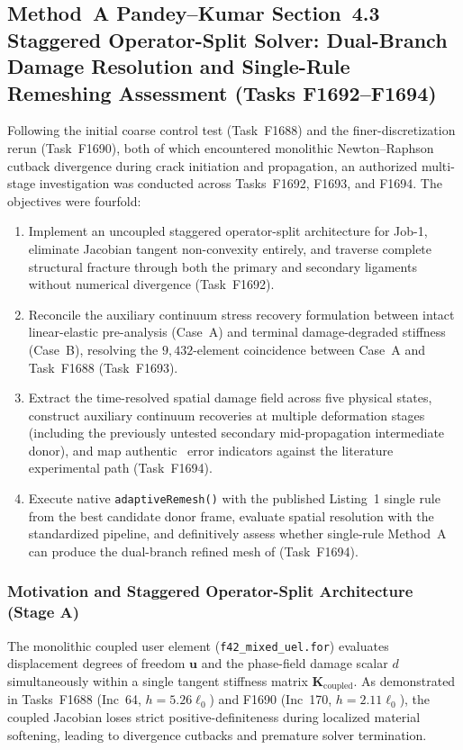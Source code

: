 \subsection{Method~A Pandey--Kumar Section~4.3 Staggered Operator-Split Solver: Dual-Branch Damage Resolution and Single-Rule Remeshing Assessment (Tasks F1692--F1694)}
\label{subsec:pandey_kumar_sec43_staggered}

Following the initial coarse control test (Task~F1688) and the finer-discretization rerun (Task~F1690), both of which encountered monolithic Newton--Raphson cutback divergence during crack initiation and propagation, an authorized multi-stage investigation was conducted across Tasks~F1692, F1693, and F1694. The objectives were fourfold:
\begin{enumerate}
  \item Implement an uncoupled staggered operator-split architecture for Job-1, eliminate Jacobian tangent non-convexity entirely, and traverse complete structural fracture through both the primary and secondary ligaments without numerical divergence (Task~F1692).
  \item Reconcile the auxiliary continuum stress recovery formulation between intact linear-elastic pre-analysis (Case~A) and terminal damage-degraded stiffness (Case~B), resolving the $9{,}432$-element coincidence between Case~A and Task~F1688 (Task~F1693).
  \item Extract the time-resolved spatial damage field across five physical states, construct auxiliary continuum recoveries at multiple deformation stages (including the previously untested secondary mid-propagation intermediate donor), and map authentic \MISESERI\ error indicators against the literature experimental path (Task~F1694).
  \item Execute native \Abaqus \texttt{adaptiveRemesh()} with the published Listing~1 single rule from the best candidate donor frame, evaluate spatial resolution with the standardized pipeline, and definitively assess whether single-rule Method~A can produce the dual-branch refined mesh of \citet[Fig.~16b]{pandey2025} (Task~F1694).
\end{enumerate}

\subsubsection{Motivation and Staggered Operator-Split Architecture (Stage A)}
The monolithic coupled user element (\texttt{f42\_mixed\_uel.for}) evaluates displacement degrees of freedom $\mathbf{u}$ and the phase-field damage scalar $d$ simultaneously within a single tangent stiffness matrix $\mathbf{K}_{\mathrm{coupled}}$. As demonstrated in Tasks~F1688 (Inc~64, $h = 5.26\ell_0$) and F1690 (Inc~170, $h = 2.11\ell_0$), the coupled Jacobian loses strict positive-definiteness during localized material softening, leading to divergence cutbacks and premature solver termination.

